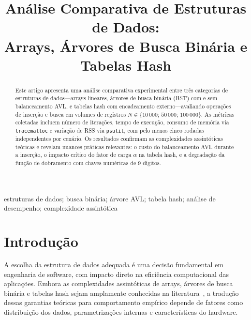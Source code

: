 \documentclass[conference,a4paper]{IEEEtran}
\begin{document}
\title{Análise Comparativa de Estruturas de Dados:\\
Arrays, Árvores de Busca Binária e Tabelas Hash}

\author{%
}

\maketitle

\begin{abstract}
Este artigo apresenta uma análise comparativa experimental entre três
categorias de estruturas de dados—arrays lineares, árvores de busca
binária (BST) com e sem balanceamento AVL, e tabelas hash com
encadeamento externo—avaliando operações de inserção e busca em volumes
de registros $N \in \{10\,000;\,50\,000;\,100\,000\}$. As métricas
coletadas incluem número de iterações, tempo de execução, consumo de
memória via \texttt{tracemalloc} e variação de RSS via \texttt{psutil},
com pelo menos cinco rodadas independentes por cenário. Os resultados
confirmam as complexidades assintóticas teóricas e revelam nuances
práticas relevantes: o custo do balanceamento AVL durante a inserção,
o impacto crítico do fator de carga $\alpha$ na tabela hash, e a
degradação da função de dobramento com chaves numéricas de 9 dígitos.
\end{abstract}

\begin{IEEEkeywords}
estruturas de dados; busca binária; árvore AVL; tabela hash; análise
de desempenho; complexidade assintótica
\end{IEEEkeywords}

\section{Introdução}

A escolha da estrutura de dados adequada é uma decisão fundamental em
engenharia de software, com impacto direto na eficiência computacional
das aplicações. Embora as complexidades assintóticas de arrays, árvores
de busca binária e tabelas hash sejam amplamente conhecidas na
literatura~\cite{cormen2022}, a tradução dessas garantias teóricas para
comportamento empírico depende de fatores como distribuição dos dados,
parametrizações internas e características do hardware.
\end{document}
